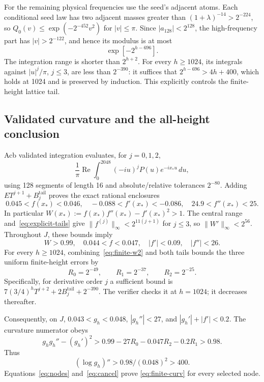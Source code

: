 \documentclass[11pt]{article}
\begin{document}
For the remaining physical frequencies use the seed's adjacent atoms.
Each conditional seed law has two adjacent masses greater than
$(1+\lambda)^{-14}>2^{-224}$, so
$Q_0(v)\le\exp(-2^{-452}v^2)$ for $|v|\le\pi$.
Since $|a_{128}|<2^{128}$, the high-frequency part has
$|v|>2^{-122}$, and hence its modulus is at most
\[
 \exp[-2^{h-696}].
\]
The integration range is shorter than $2^{h+2}$.
For every $h\ge1024$, its integrals against $|u|^j/\pi$, $j\le3$,
are less than $2^{-390}$: it suffices that
$2^{h-696}>4h+400$, which holds at 1024 and is preserved by induction.
This explicitly controls the finite-height lattice tail.

\subsection{Validated curvature and the all-height conclusion}
Acb validated integration evaluates, for $j=0,1,2$,
\[
 \frac1\pi\operatorname{Re}\int_0^{2048}
            (-iu)^jP(u)e^{-ix_*u}\,du,
\]
using 128 segments of length 16 and absolute/relative tolerances
$2^{-80}$. Adding $ET^{j+1}+B_j^{\mathrm{tail}}$ proves the exact
rational enclosures
\begin{equation}\label{eq:boxes}
 0.045<f(x_*)<0.046,\quad
 -0.088<f'(x_*)<-0.086,\quad
 24.9<f''(x_*)<25.
\end{equation}
In particular $W(x_*):=f(x_*)f''(x_*)-f'(x_*)^2>1$.
The central range and~\eqref{eq:explicit-tails} give
$\|f^{(j)}\|_\infty<2^{11(j+1)}$ for $j\le3$,
so $\|W'\|_\infty<2^{56}$.
Throughout $J$, these bounds imply
\begin{equation}\label{eq:Jnumeric}
 W>0.99,\quad0.044<f<0.047,\quad |f'|<0.09,\quad |f''|<26.
\end{equation}
For every $h\ge1024$, combining~\eqref{eq:finite-w2} and both tails
bounds the three uniform finite-height errors by
\begin{equation}\label{eq:finite-C2}
 R_0=2^{-49},\qquad R_1=2^{-37},\qquad R_2=2^{-25}.
\end{equation}
Specifically, for derivative order $j$ a sufficient bound is
$7(3/4)^hT^{j+2}+2B_j^{\mathrm{tail}}+2^{-390}$.
The verifier checks it at $h=1024$; it decreases thereafter.

Consequently, on $J$,
$0.043<g_h<0.048$, $|g_h''|<27$, and
$|g_h'|+|f'|<0.2$. The curvature numerator obeys
\[
 g_hg_h''-(g_h')^2
 >0.99-27R_0-0.047R_2-0.2R_1>0.98.
\]
Thus
\[
 (\log g_h)''>0.98/(0.048)^2>400.
\]
Equations~\eqref{eq:nodes} and~\eqref{eq:cancel} prove
\eqref{eq:finite-curv} for every selected node.
\end{document}
